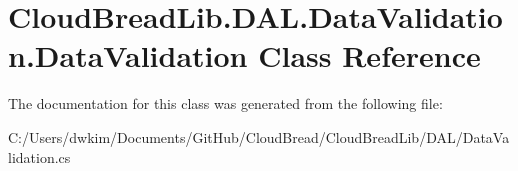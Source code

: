 \hypertarget{a00073}{}\section{Cloud\+Bread\+Lib.\+D\+A\+L.\+Data\+Validation.\+Data\+Validation Class Reference}
\label{a00073}


The documentation for this class was generated from the following file\+:\begin{DoxyCompactItemize}
\item 
C\+:/\+Users/dwkim/\+Documents/\+Git\+Hub/\+Cloud\+Bread/\+Cloud\+Bread\+Lib/\+D\+A\+L/Data\+Validation.\+cs\end{DoxyCompactItemize}
